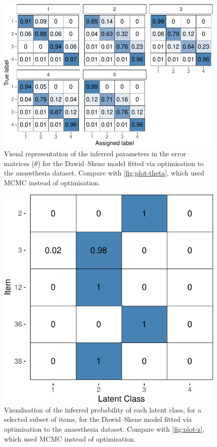 \begin{figure}

{\centering \includegraphics{rater_files/figure-latex/plot-theta-fit2-1} 

}

\caption{Visual representation of the inferred parameters in the error matrices ($\theta$) for the Dawid--Skene model fitted via optimisation to the anaesthesia dataset.  Compare with \autoref{fig:plot-theta}, which used MCMC instead of optimisation.}\label{fig:plot-theta-fit2}
\end{figure}

\begin{figure}

{\centering \includegraphics{rater_files/figure-latex/plot-z-fit2-1} 

}

\caption{Visualisation of the inferred probability of each latent class, for a selected subset of items, for the Dawid--Skene model fitted via optimisation to the anaesthesia dataset.  Compare with \autoref{fig:plot-z}, which used MCMC instead of optimisation.}\label{fig:plot-z-fit2}
\end{figure}

